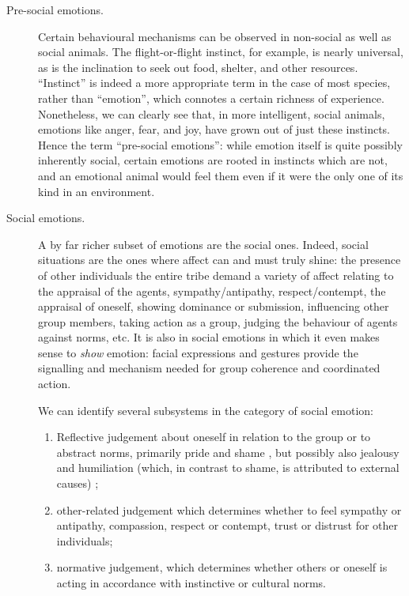 \begin{description}
	\item[Pre-social emotions.] Certain behavioural mechanisms can be observed in non-social as well as social animals. The flight-or-flight instinct, for example, is nearly universal, as is the inclination to seek out food, shelter, and other resources. ``Instinct'' is indeed a more appropriate term in the case of most species, rather than ``emotion'', which connotes a certain richness of experience. Nonetheless, we can clearly see that, in more intelligent, social animals, emotions like anger, fear, and joy, have grown out of just these instincts. Hence the term ``pre-social emotions'': while emotion itself is quite possibly inherently social, certain emotions are rooted in instincts which are not, and an emotional animal would feel them even if it were the only one of its kind in an environment.
	
	\item[Social emotions.] A by far richer subset of emotions are the social ones. Indeed, social situations are the ones where affect can and must truly shine: the presence of other individuals the entire tribe demand a variety of affect relating to the appraisal of the agents, sympathy/antipathy, respect/contempt, the appraisal of oneself, showing dominance or submission, influencing other group members, taking action as a group, judging the behaviour of agents against norms, etc. It is also in social emotions in which it even makes sense to {\em show} emotion: facial expressions and gestures provide the signalling and mechanism needed for group coherence and coordinated action.
	
	We can identify several subsystems in the category of social emotion:
	
	\begin{enumerate}
		\item Reflective judgement about oneself in relation to the group or to abstract norms, primarily pride and shame \cite{Teroni2008}, but possibly also jealousy and humiliation (which, in contrast to shame, is attributed to external causes) \cite{fontaine2009};
		\item other-related judgement which determines whether to feel sympathy or antipathy, compassion, respect or contempt, trust or distrust for other individuals;
		\item normative judgement, which determines whether others or oneself is acting in accordance with instinctive or cultural norms.
	\end{enumerate}
	

\end{description}
